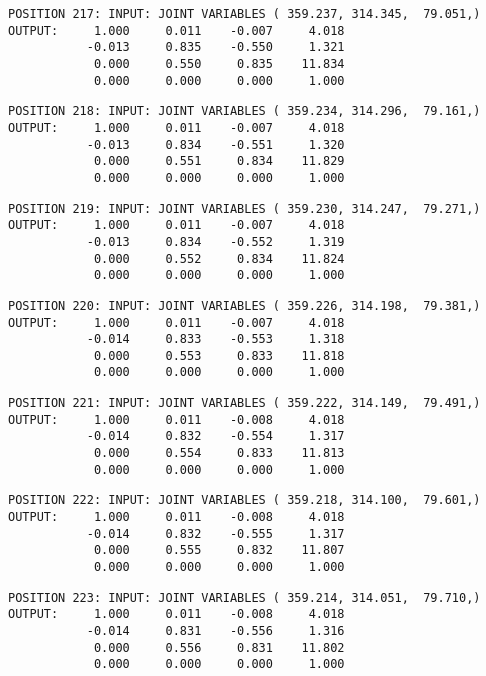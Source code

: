 \begin{verbatim}
POSITION 217: INPUT: JOINT VARIABLES ( 359.237, 314.345,  79.051,)
OUTPUT:     1.000     0.011    -0.007     4.018
           -0.013     0.835    -0.550     1.321
            0.000     0.550     0.835    11.834
            0.000     0.000     0.000     1.000
\end{verbatim} \pagebreak[1]\begin{verbatim}
POSITION 218: INPUT: JOINT VARIABLES ( 359.234, 314.296,  79.161,)
OUTPUT:     1.000     0.011    -0.007     4.018
           -0.013     0.834    -0.551     1.320
            0.000     0.551     0.834    11.829
            0.000     0.000     0.000     1.000
\end{verbatim} \pagebreak[1]\begin{verbatim}
POSITION 219: INPUT: JOINT VARIABLES ( 359.230, 314.247,  79.271,)
OUTPUT:     1.000     0.011    -0.007     4.018
           -0.013     0.834    -0.552     1.319
            0.000     0.552     0.834    11.824
            0.000     0.000     0.000     1.000
\end{verbatim} \pagebreak[1]\begin{verbatim}
POSITION 220: INPUT: JOINT VARIABLES ( 359.226, 314.198,  79.381,)
OUTPUT:     1.000     0.011    -0.007     4.018
           -0.014     0.833    -0.553     1.318
            0.000     0.553     0.833    11.818
            0.000     0.000     0.000     1.000
\end{verbatim} \pagebreak[1]\begin{verbatim}
POSITION 221: INPUT: JOINT VARIABLES ( 359.222, 314.149,  79.491,)
OUTPUT:     1.000     0.011    -0.008     4.018
           -0.014     0.832    -0.554     1.317
            0.000     0.554     0.833    11.813
            0.000     0.000     0.000     1.000
\end{verbatim} \pagebreak[1]\begin{verbatim}
POSITION 222: INPUT: JOINT VARIABLES ( 359.218, 314.100,  79.601,)
OUTPUT:     1.000     0.011    -0.008     4.018
           -0.014     0.832    -0.555     1.317
            0.000     0.555     0.832    11.807
            0.000     0.000     0.000     1.000
\end{verbatim} \pagebreak[1]\begin{verbatim}
POSITION 223: INPUT: JOINT VARIABLES ( 359.214, 314.051,  79.710,)
OUTPUT:     1.000     0.011    -0.008     4.018
           -0.014     0.831    -0.556     1.316
            0.000     0.556     0.831    11.802
            0.000     0.000     0.000     1.000
\end{verbatim} \pagebreak[1]\begin{verbatim}

\end{verbatim}
